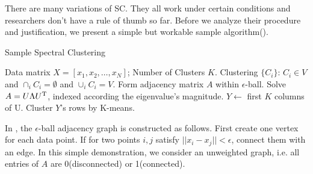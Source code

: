 There are many variations of SC. They all work under certain conditions
and researchers don't have a rule of thumb so far. Before we analyze their
procedure and justification, we present a simple but workable sample 
algorithm(\ralg{\ref{alg:sc_sample}}). 

\begin{algorithm}[htb]
	\caption{Sample Spectral Clustering}
	\label{alg:sc_sample}
	\begin{algorithmic}[1]
		\REQUIRE Data matrix $X = [x_1, x_2, \ldots, x_N]$;  
		Number of Clusters $K$. 
		\ENSURE Clustering $\{C_i\}$: $C_i \in V$ 
			and $\cap_i C_i = \emptyset$
			and $\cup_i C_i = V$. 
		\STATE Form adjacency matrix $A$ within $\epsilon$-ball.
		\STATE Solve $A = U \Lambda U^\mathrm{T}$, indexed according 
		the eigenvalue's magnitude. 
		\STATE $Y \leftarrow$ first $K$ columns of U. 
		\STATE Cluster $Y$'s rows by K-means. 
	\end{algorithmic}
\end{algorithm}

In \ralg{\ref{alg:sc_sample}}, the $\epsilon$-ball adjacency graph is 
constructed as follows. First create one vertex for each data point. 
If for two points $i,j$ satisfy $||x_i-x_j|| < \epsilon$, connect 
them with an edge. In this simple demonstration, we consider an unweighted
graph, i.e. all entries of $A$ are 0(disconnected) or 1(connected). 

